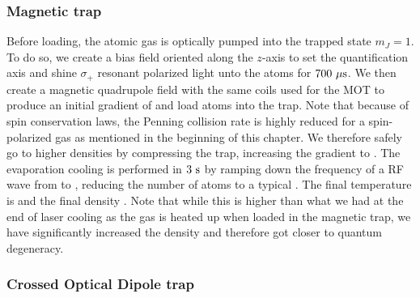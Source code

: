 \subsubsection{Magnetic trap}

Before loading, the atomic gas is optically pumped into the trapped state $m_J=1$. To do so, we create a bias field oriented along the $z$-axis to set the quantification axis and shine $\sigma_{+}$ resonant polarized light unto the atoms for $700 \ \mu \rm{s}$. We then create a magnetic quadrupole field with the same coils used for the MOT to produce an initial gradient of  and load  atoms into the trap. Note that because of spin conservation laws, the Penning collision rate is highly reduced for a spin-polarized gas as mentioned in the beginning of this chapter. We therefore safely go to higher densities by compressing the trap, increasing the gradient to . The evaporation cooling is performed in $3 \ \rm{s}$ by ramping down the frequency of a RF wave from  to , reducing the number of atoms to a typical . The final temperature is  and the final density . Note that while this is higher than what we had at the end of laser cooling as the gas is heated up when loaded in the magnetic trap, we have significantly increased the density and therefore got closer to quantum degeneracy.

\subsubsection{Crossed Optical Dipole trap}

